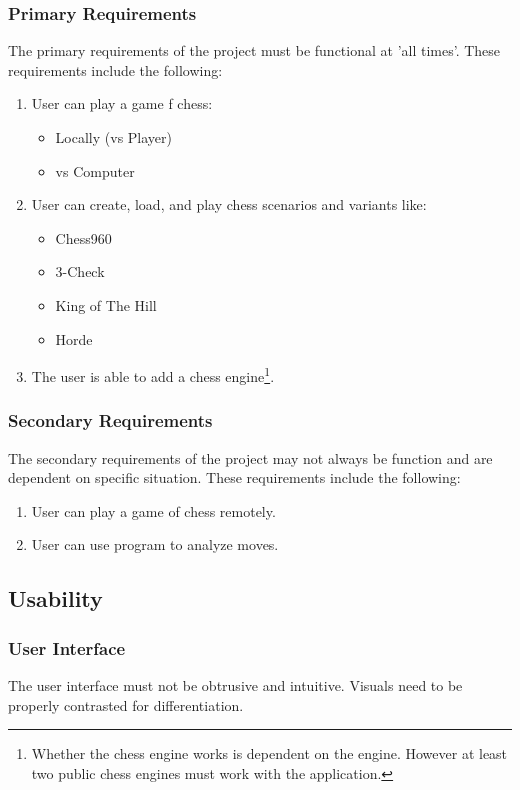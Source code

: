 \documentclass{article}
\begin{document}
\subsubsection{Primary Requirements}
The primary requirements of the project must be functional at 'all times'. These requirements include the following:
\begin{enumerate}
\item User can play a game f chess:
\begin{itemize}
\item Locally (vs Player)
\item vs Computer
\end{itemize}

\item User can create, load, and play chess scenarios and variants like:


\begin{itemize}
\item Chess960 
\item 3-Check
\item King of The Hill
\cite{variants}
\item Horde %
\end{itemize}

\item The user is able to add a chess engine\footnote{Whether the chess engine works is dependent on the engine. However at least two public chess engines must work with the application.}.
\end{enumerate}
\subsubsection{Secondary Requirements}
The secondary requirements of the project may not always be function and are dependent on specific situation. These requirements include the following:
\begin{enumerate}
\item User can play a game of chess remotely.
\item User can use program to analyze moves.
\end{enumerate}
\subsection{Usability}
\subsubsection{User Interface}
The user interface must not be obtrusive and intuitive. Visuals need to be properly contrasted for differentiation. 
\end{document}
